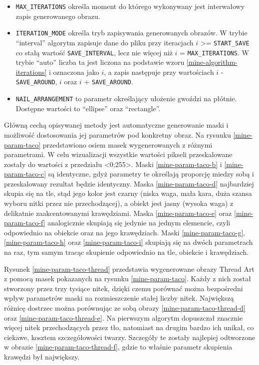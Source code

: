 \begin{itemize}
        \item \texttt{MAX_ITERATIONS} określa moment do którego wykonywany jest interwałowy zapis generowanego obrazu.
        \item \texttt{ITERATION_MODE} określa tryb zapisywania generowanych obrazów. W trybie ``interval'' algorytm zapisuje dane do pliku przy iteracjach \(i\) >= \texttt{START_SAVE} co stałą wartość \texttt{SAVE_INTERVAL}, lecz nie więcej niż \(i\) = \texttt{MAX_ITERATIONS}. W trybie ``auto'' liczba ta jest liczona na podstawie wzoru \ref{mine-algorithm-iterations} i oznaczona jako \(i\), a zapis następuje przy wartościach \(i\) - \texttt{SAVE_AROUND}, \(i\) oraz \(i\) + \texttt{SAVE_AROUND}.
        \item \texttt{NAIL_ARRANGEMENT} to parametr określający ułożenie gwoździ na płótnie. Dostępne wartości to ``ellipse'' oraz ``rectangle''.
    \end{itemize}
    
    Główną cechą opisywanej metody jest automatyczne generowanie maski i możliwość dostosowania jej parametrów pod konkretny obraz. Na rysunku \ref{mine-param-taco} przedstawiono osiem masek wygenerowanych z różnymi parametrami. W celu wizualizacji wszystkie wartości pikseli przeskalowane zostały do wartości z przedziału <0;255>. Maski \ref{mine-param-taco-b} i \ref{mine-param-taco-c} są identyczne, gdyż parametry te określają proporcję miedzy sobą i przeskalowany rezultat będzie identyczny. Maska \ref{mine-param-taco-d} najbardziej skupia się na tle, stąd jego kolor jest czarny (niska waga, mała kara, duża szansa wyboru nitki przez nie przechodzącej), a obiekt jest jasny (wysoka waga) z delikatnie zaakcentowanymi krawędziami. Maska \ref{mine-param-taco-e} oraz \ref{mine-param-taco-f} analogicznie skupiają się jedynie na jednym elemencie, czyli odpowiednio na obiekcie oraz na jego krawędziach. Maski \ref{mine-param-taco-g}, \ref{mine-param-taco-h} oraz \ref{mine-param-taco-i} skupiają się na dwóch parametrach na raz, tym samym tracąc skupienie odpowiednio na tle, obiekcie i krawędziach.
    
    Rysunek \ref{mine-param-taco-thread} przedstawia wygenerowane obrazy Thread Art z pomocą masek pokazanych na rysunku \ref{mine-param-taco}. Każdy z nich został stworzony przez trzy tysiące nitek, dzięki czemu porównać można bezpośredni wpływ parametrów maski na rozmieszczenie stałej liczby nitek. Największą różnicę dostrzec można porównując ze sobą obrazy \ref{mine-param-taco-thread-d} oraz \ref{mine-param-taco-thread-e}. Na pierwszym algorytm dopuszczał znacznie więcej nitek przechodzących przez tło, natomiast na drugim bardzo ich unikał, co ciekawe, kosztem szczegółowości twarzy. Szczegóły te zostały najlepiej odtworzone w obrazie \ref{mine-param-taco-thread-f}, gdzie to właśnie parametr skupienia krawędzi był największy.

